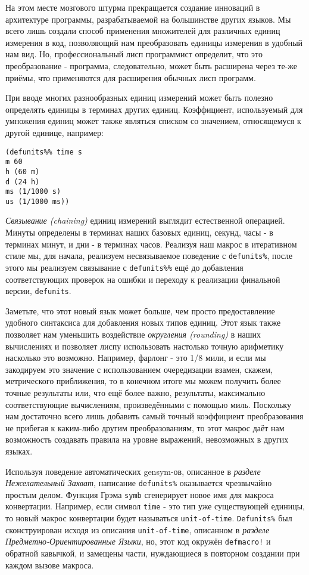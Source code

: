 На этом месте мозгового штурма прекращается создание инноваций в архитектуре программы, разрабатываемой на большинстве других языков. Мы всего лишь создали способ применения множителей для различных единиц измерения в код, позволяющий нам преобразовать единицы измерения в удобный нам вид. Но, профессиональный лисп программист определит, что это преобразование - программа, следовательно, может быть расширена через те-же приёмы, что применяются для расширения обычных лисп программ.

При вводе многих разнообразных единиц измерений может быть полезно определять единицы в терминах других единиц. Коэффициент, используемый для умножения единиц может также являться списком со значением, относящемуся к другой единице, например:

\begin{verbatim}
(defunits%% time s
m 60
h (60 m)
d (24 h)
ms (1/1000 s)
us (1/1000 ms))
\end{verbatim}

\emph{Связывание (chaining)} единиц измерений выглядит естественной операцией. Минуты определены в терминах наших базовых единиц, секунд, часы - в терминах минут, и дни - в терминах часов. Реализуя наш макрос в итеративном стиле мы, для начала, реализуем несвязываемое поведение с \verb"defunits%", после этого мы реализуем связывание с \verb"defunits%%" ещё до добавления соответствующих проверок на ошибки и переходу к реализации финальной версии, \verb"defunits".

Заметьте, что этот новый язык может больше, чем просто предоставление удобного синтаксиса для добавления новых типов единиц. Этот язык также позволяет нам уменьшить воздействие \emph{округления (rounding)} в наших вычислениях и позволяет лиспу использовать настолько точную арифметику насколько это возможно. Например, фарлонг - это 1/8 мили, и если мы закодируем это значение с использованием очередизации взамен, скажем, метрического приближения, то в конечном итоге мы можем получить более точные результаты или, что ещё более важно, результаты, максимально соответствующие вычислениям, произведёнными с помощью миль. Поскольку нам достаточно всего лишь добавить самый точный коэффициент преобразования не прибегая к каким-либо другим преобразованиям, то этот макрос даёт нам возможность создавать правила на уровне выражений, невозможных в других языках.

Используя поведение автоматических gensym-ов, описанное в \emph{разделе Нежелательный Захват}, написание \verb"defunits%" оказывается чрезвычайно простым делом. Функция Грэма \verb"symb" сгенерирует новое имя для макроса конвертации. Например, если символ \verb"time" - это тип уже существующей единицы, то новый макрос конвертации будет называться \verb"unit-of-time". \verb"Defunits%" был сконструирован исходя из описания \verb"unit-of-time", описанном в \emph{разделе Предметно-Ориентированные Языки}, но, этот код окружён \verb"defmacro!" и обратной кавычкой, и замещены части, нуждающиеся в повторном создании при каждом вызове макроса.

